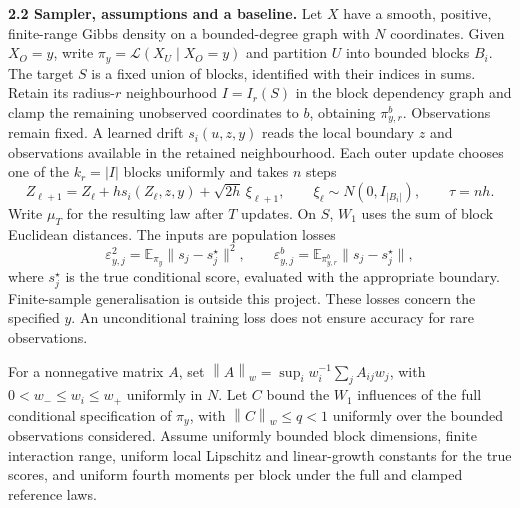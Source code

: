 \documentclass[12pt,a4paper]{article}
\newcommand{\E}{\mathbb E}
\newcommand{\W}{W_1}
\newcommand{\piy}{\pi_y}
\newcommand{\pir}{\pi_{y,r}^{b}}
\newcommand{\normw}[1]{\left\|#1\right\|_w}
\begin{document}

\textbf{2.2 Sampler, assumptions and a baseline.}
Let $X$ have a smooth, positive, finite-range Gibbs density on a bounded-degree graph with $N$ coordinates. Given $X_O=y$, write $\piy=\mathcal L(X_U\mid X_O=y)$ and partition $U$ into bounded blocks $B_i$. The target $S$ is a fixed union of blocks, identified with their indices in sums. Retain its radius-$r$ neighbourhood $I=I_r(S)$ in the block dependency graph and clamp the remaining unobserved coordinates to $b$, obtaining $\pir$. Observations remain fixed. A learned drift $s_i(u,z,y)$ reads the local boundary $z$ and observations available in the retained neighbourhood. Each outer update chooses one of the $k_r=|I|$ blocks uniformly and takes $n$ steps
\begin{equation}\label{eq:update}
 Z_{\ell+1}=Z_\ell+h s_i(Z_\ell,z,y)+\sqrt{2h}\,\xi_{\ell+1},
 \qquad \xi_\ell\sim N(0,I_{|B_i|}),\qquad \tau=nh.
\end{equation}
Write $\mu_T$ for the resulting law after $T$ updates. On $S$, $\W$ uses the sum of block Euclidean distances. The inputs are population losses
\[
 \varepsilon_{y,j}^2=\E_{\piy}\|s_j-s_j^\star\|^2,
 \qquad \varepsilon^b_{y,j}=\E_{\pir}\|s_j-s_j^\star\|,
\]
where $s_j^\star$ is the true conditional score, evaluated with the appropriate boundary. Finite-sample generalisation is outside this project. These losses concern the specified $y$. An unconditional training loss does not ensure accuracy for rare observations.

For a nonnegative matrix $A$, set $\normw{A}=\sup_i w_i^{-1}\sum_j A_{ij}w_j$, with $0<w_-\leq w_i\leq w_+$ uniformly in $N$. Let $C$ bound the $\W$ influences of the full conditional specification of $\piy$, with $\normw{C}\leq q<1$ uniformly over the bounded observations considered. Assume uniformly bounded block dimensions, finite interaction range, uniform local Lipschitz and linear-growth constants for the true scores, and uniform fourth moments per block under the full and clamped reference laws.
\end{document}
